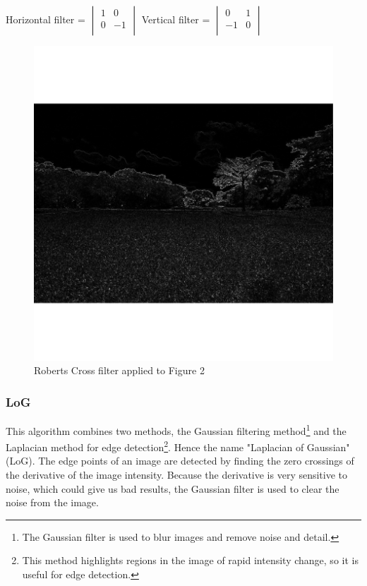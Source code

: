 \documentclass[12pt]{article}
\begin{document}
Horizontal filter = $\begin{vmatrix}
        1 & 0 \\
        0 & -1 \\
\end{vmatrix}$\hspace{11mm}
Vertical filter = $\begin{vmatrix}
        0 & 1\\
        -1 & 0\\
\end{vmatrix}$

\begin{figure}[h]
\centering
\includegraphics[scale = 0.45]{img/landscape_RobertsCross}
\caption{Roberts Cross filter applied to Figure 2}
\end{figure}

\subsubsection{LoG}
This algorithm combines two methods, the Gaussian filtering method\footnote{The Gaussian filter is used to blur images and remove noise and detail.} and the Laplacian method for edge detection\footnote{This method highlights regions in the image of rapid intensity change, so it is useful for edge detection.}. Hence the name "Laplacian of Gaussian" (LoG).
The edge points of an image are detected by finding the zero crossings of the  derivative of the image intensity. Because the  derivative is very sensitive to noise, which could give us bad results, the Gaussian filter is used to clear the noise from the image. 
\newline
\end{document}
